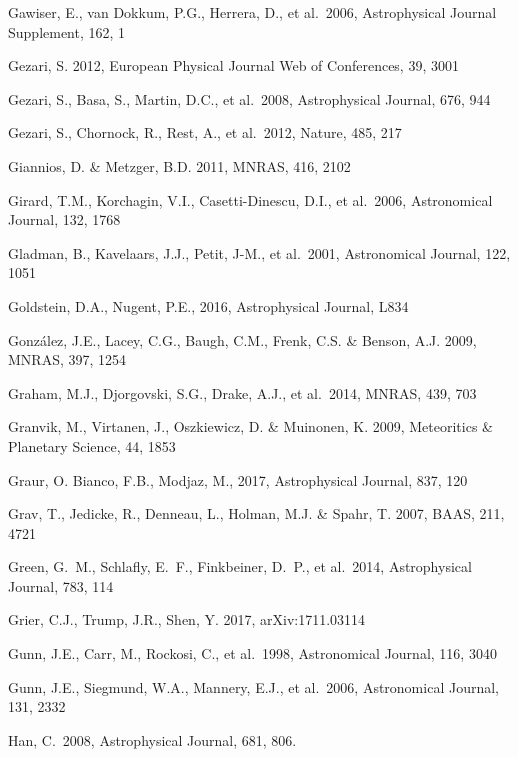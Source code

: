 \documentclass{emulateapj}
\begin{document}
\begin{thebibliography}{}
\bibitem[()]{} Gawiser, E., van Dokkum, P.G., Herrera, D., et al.~2006, Astrophysical Journal Supplement, 162, 1


\bibitem[()]{} Gezari, S. 2012, European Physical Journal Web of Conferences, 39, 3001

\bibitem[()]{} Gezari, S., Basa, S., Martin, D.C., et al.~2008, Astrophysical Journal, 676, 944

\bibitem[()]{} Gezari, S., Chornock, R., Rest, A., et al.~2012, Nature, 485, 217

\bibitem[()]{} Giannios, D. \& Metzger, B.D. 2011, MNRAS, 416, 2102

\bibitem[()]{} Girard, T.M., Korchagin, V.I., Casetti-Dinescu, D.I., et al.~2006, Astronomical
             Journal, 132, 1768

\bibitem[()]{} Gladman, B., Kavelaars, J.J., Petit, J-M., et al.~2001, Astronomical Journal, 122, 1051

\bibitem[()]{} Goldstein, D.A., Nugent, P.E., 2016, Astrophysical Journal, L834

\bibitem[()]{} Gonz\'{a}lez, J.E., Lacey, C.G., Baugh, C.M., Frenk, C.S. \& Benson, A.J. 2009, MNRAS, 397, 1254

\bibitem[()]{} Graham, M.J., Djorgovski, S.G., Drake, A.J., et al.~2014, MNRAS, 439, 703

\bibitem[()]{} Granvik, M., Virtanen, J., Oszkiewicz, D. \& Muinonen, K. 2009, Meteoritics \& Planetary Science, 44, 1853

\bibitem[()]{} Graur, O. Bianco, F.B., Modjaz, M., 2017, Astrophysical Journal, 837, 120

\bibitem[()]{} Grav, T., Jedicke, R., Denneau, L., Holman, M.J.  \& Spahr, T. 2007, BAAS, 211, 4721

\bibitem[()]{} Green, G.~M., Schlafly, E.~F., Finkbeiner, D.~P., et al.~2014, Astrophysical Journal, 783, 114

\bibitem[()]{} Grier, C.J., Trump, J.R., Shen, Y. 2017, arXiv:1711.03114

\bibitem[()]{} Gunn, J.E., Carr, M., Rockosi, C., et al.~1998, Astronomical Journal, 116, 3040

\bibitem[()]{} Gunn, J.E., Siegmund, W.A., Mannery, E.J., et al.~2006, Astronomical Journal, 131, 2332

\bibitem[()]{} Han, C.~2008, Astrophysical Journal, 681, 806.


\end{thebibliography}
\end{document}
